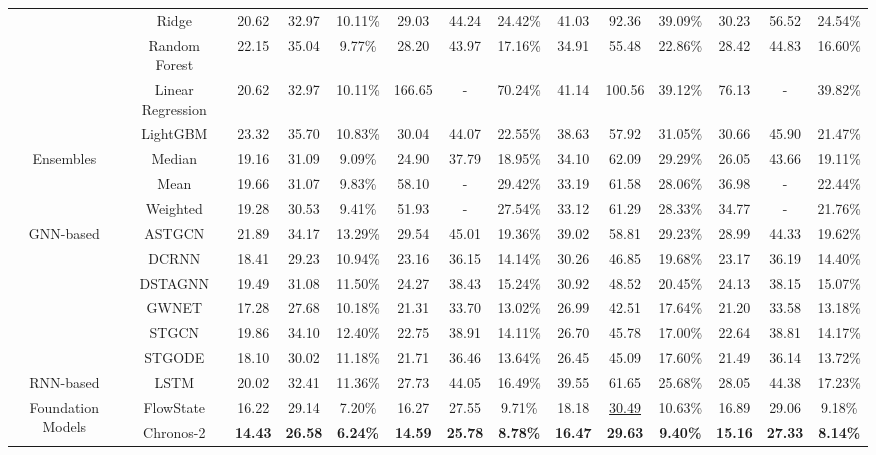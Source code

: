 \documentclass[10pt]{article}
\begin{document}
\begin{table}[t]
{\begin{tabular}{c|c|c|c|c|c|c|c|c|c|c|c|c|c}
& Ridge & 20.62 & 32.97 & 10.11\% & 29.03 & 44.24 & 24.42\% & 41.03 & 92.36 & 39.09\% & 30.23 & 56.52 & 24.54\% \\
& Random Forest & 22.15 & 35.04 & 9.77\% & 28.20 & 43.97 & 17.16\% & 34.91 & 55.48 & 22.86\% & 28.42 & 44.83 & 16.60\% \\
& Linear Regression & 20.62 & 32.97 & 10.11\% & 166.65 & - & 70.24\% & 41.14 & 100.56 & 39.12\% & 76.13 & - & 39.82\% \\
& LightGBM & 23.32 & 35.70 & 10.83\% & 30.04 & 44.07 & 22.55\% & 38.63 & 57.92 & 31.05\% & 30.66 & 45.90 & 21.47\% \\
\midrule
\multirow{3}{*}{Ensembles}
& Median & 19.16 & 31.09 & 9.09\% & 24.90 & 37.79 & 18.95\% & 34.10 & 62.09 & 29.29\% & 26.05 & 43.66 & 19.11\% \\
& Mean & 19.66 & 31.07 & 9.83\% & 58.10 & - & 29.42\% & 33.19 & 61.58 & 28.06\% & 36.98 & - & 22.44\% \\
& Weighted & 19.28 & 30.53 & 9.41\% & 51.93 & - & 27.54\% & 33.12 & 61.29 & 28.33\% & 34.77 & - & 21.76\% \\
\midrule
\multirow{6}{*}{GNN-based}
& ASTGCN & 21.89 & 34.17 & 13.29\% & 29.54 & 45.01 & 19.36\% & 39.02 & 58.81 & 29.23\% & 28.99 & 44.33 & 19.62\% \\
& DCRNN & 18.41 & 29.23 & 10.94\% & 23.16 & 36.15 & 14.14\% & 30.26 & 46.85 & 19.68\% & 23.17 & 36.19 & 14.40\% \\
& DSTAGNN & 19.49 & 31.08 & 11.50\% & 24.27 & 38.43 & 15.24\% & 30.92 & 48.52 & 20.45\% & 24.13 & 38.15 & 15.07\% \\
& GWNET & 17.28 & 27.68 & 10.18\% & 21.31 & 33.70 & 13.02\% & 26.99 & 42.51 & 17.64\% & 21.20 & 33.58 & 13.18\% \\
& STGCN & 19.86 & 34.10 & 12.40\% & 22.75 & 38.91 & 14.11\% & 26.70 & 45.78 & 17.00\% & 22.64 & 38.81 & 14.17\% \\
& STGODE & 18.10 & 30.02 & 11.18\% & 21.71 & 36.46 & 13.64\% & 26.45 & 45.09 & 17.60\% & 21.49 & 36.14 & 13.72\% \\
\midrule
\multirow{1}{*}{RNN-based}
& LSTM & 20.02 & 32.41 & 11.36\% & 27.73 & 44.05 & 16.49\% & 39.55 & 61.65 & 25.68\% & 28.05 & 44.38 & 17.23\% \\
\midrule
\multirow{8}{*}{Foundation Models}
& FlowState& 16.22 & 29.14 & 7.20\% & 16.27 & 27.55 & 9.71\% & 18.18 & \underline{30.49} & 10.63\% & 16.89 & 29.06 & 9.18\% \\
& Chronos-2 & \textbf{14.43} & \textbf{26.58} & \textbf{6.24\%} & \textbf{14.59} & \textbf{25.78} & \textbf{8.78\%} & \textbf{16.47} & \textbf{29.63} & \textbf{9.40\%} & \textbf{15.16} & \textbf{27.33} & \textbf{8.14\%} \\

\end{tabular}}
\end{table}
\end{document}

